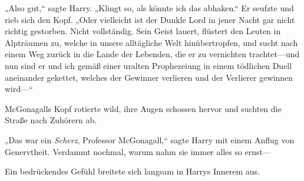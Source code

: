 „Also gut,“ sagte Harry. „Klingt so, als könnte ich das abhaken.“ Er seufzte und rieb sich den Kopf. „Oder vielleicht ist der Dunkle Lord in jener Nacht gar nicht richtig gestorben. Nicht vollständig. Sein Geist lauert, flüstert den Leuten in Alpträumen zu, welche in unsere alltägliche Welt hinübertropfen, und sucht nach einem Weg zurück in die Lande der Lebenden, die er zu vernichten trachtet—und nun sind er und ich gemäß einer uralten Prophezeiung in einem tödlichen Duell aneinander gekettet, welches der Gewinner verlieren und der Verlierer gewinnen wird—“

McGonagalls Kopf rotierte wild, ihre Augen schossen hervor und suchten die Straße nach Zuhörern ab.

„Das war ein \emph{Scherz}, Professor McGonagall,“ sagte Harry mit einem Anflug von Genervtheit. Verdammt nochmal, warum nahm sie immer alles so ernst—

Ein bedrückendes Gefühl breitete sich langsam in Harrys Innerem aus.

